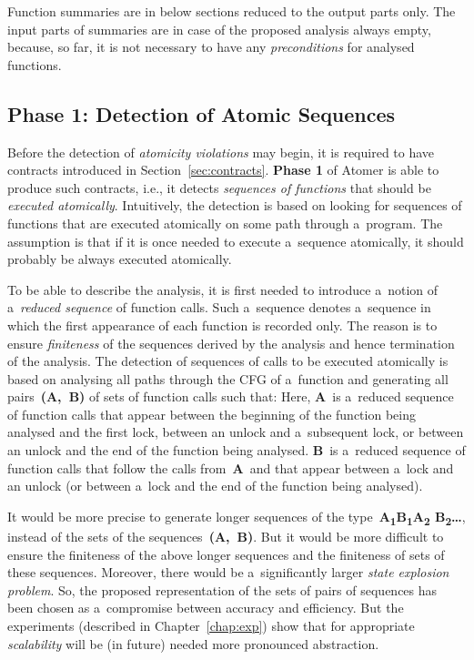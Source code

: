 Function summaries are in below sections reduced to the output parts only.
The input parts of summaries are in case of the proposed analysis always
empty, because, so far, it is not necessary to have any \emph{preconditions}
for analysed functions.


\newpage
\subsection{Phase 1: Detection of Atomic Sequences}
\label{sec:designPhase1}

Before the detection of \emph{atomicity violations} may begin, it is
required to have contracts introduced in Section~\ref{sec:contracts}.
\textbf{Phase 1} of Atomer is able to produce such contracts, i.e.,
it detects \emph{sequences of functions} that should be \emph{executed
atomically}. Intuitively, the detection is based on looking for sequences
of functions that are executed atomically on some path through
a~program. The assumption is that if it is once needed to execute
a~sequence atomically, it should probably be always executed atomically.

To be able to describe the analysis, it is first needed to introduce
a~notion of a~\emph{reduced sequence} of function calls. Such a~sequence
denotes a~sequence in which the first appearance of each function is
recorded only. The reason is to ensure \emph{finiteness} of the sequences
derived by the analysis and hence termination of the analysis. The detection
of sequences of calls to be executed atomically is based on analysing all
paths through the CFG of a~function and generating all pairs~\textbf{(A,~B)}
of sets of function calls such that: Here, \textbf{A}~is a~reduced
sequence of function calls that appear between the beginning of the function
being analysed and the first lock, between an unlock and a~subsequent lock,
or between an unlock and the end of the function being analysed. \textbf{B}~is
a~reduced sequence of function calls that follow the calls from~\textbf{A}~and
that appear between a~lock and an unlock (or between a~lock and the end of
the function being analysed).

It would be more precise to generate longer sequences of
the type~\textbf{A\textsubscript{1}B\textsubscript{1}A\textsubscript{2}%
B\textsubscript{2}\ldots}, instead of the sets of the
sequences~\textbf{(A,~B)}. But it would be more difficult to ensure the
finiteness of the above longer sequences and the finiteness of sets of
these sequences. Moreover, there would be a~significantly larger
\emph{state explosion problem}. So, the proposed representation of the
sets of pairs of sequences has been chosen as a~compromise between
accuracy and efficiency. But the experiments (described in
Chapter~\ref{chap:exp}) show that for appropriate \emph{scalability} will
be (in future) needed more pronounced abstraction.

